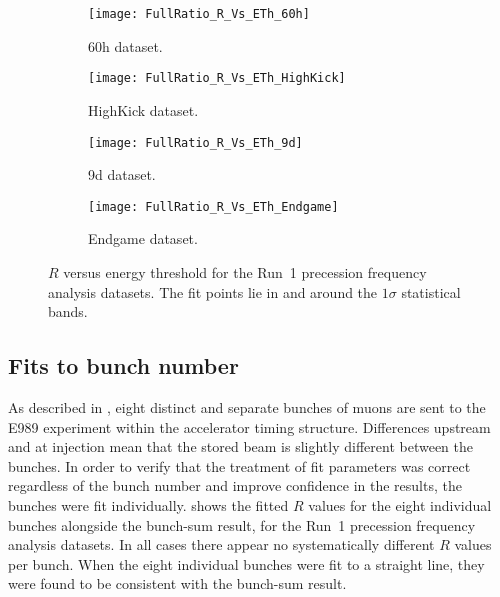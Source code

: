 \begin{figure}
\centering
    \begin{subfigure}[]{0.45\textwidth}
        \centering
        \texttt{[image: FullRatio\_R\_Vs\_ETh\_60h]}
        \caption{60h dataset.}
    \end{subfigure}%
    \begin{subfigure}[]{0.45\textwidth}
        \centering
        \texttt{[image: FullRatio\_R\_Vs\_ETh\_HighKick]}
        \caption{HighKick dataset.}
    \end{subfigure}

    \begin{subfigure}[]{0.45\textwidth}
        \centering
        \texttt{[image: FullRatio\_R\_Vs\_ETh\_9d]}
        \caption{9d dataset.}
    \end{subfigure}%
    \begin{subfigure}[]{0.45\textwidth}
        \centering
        \texttt{[image: FullRatio\_R\_Vs\_ETh\_Endgame]}
        \caption{Endgame dataset.}
    \end{subfigure}
\caption[$R$ versus energy threshold]{$R$ versus energy threshold for the Run~1 precession frequency analysis datasets. The fit points lie in and around the $1\sigma$ statistical bands.}
\label{fig:energyThresholdScan_R}
\end{figure}



\clearpage


\subsection{Fits to bunch number}


As described in , eight distinct and separate bunches of muons are sent to the E989 experiment within the accelerator timing structure. Differences upstream and at injection mean that the stored beam is slightly different between the bunches. In order to verify that the treatment of fit parameters was correct regardless of the bunch number and improve confidence in the results, the bunches were fit individually.  shows the fitted $R$ values for the eight individual bunches alongside the bunch-sum result, for the Run~1 precession frequency analysis datasets. In all cases there appear no systematically different $R$ values per bunch. When the eight individual bunches were fit to a straight line, they were found to be consistent with the bunch-sum result.


